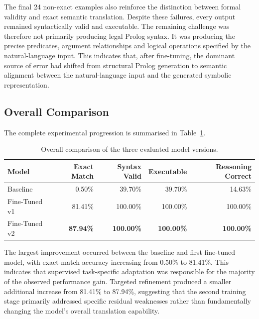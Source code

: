 \documentclass[11pt]{article} %
\theoremstyle{plain}
\theoremstyle{definition}
\begin{document}
The final 24 non-exact examples also reinforce the distinction between formal
validity and exact semantic translation. Despite these failures, every output
remained syntactically valid and executable. The remaining challenge was
therefore not primarily producing legal Prolog syntax. It was producing the
precise predicates, argument relationships and logical operations specified by
the natural-language input. This indicates that, after fine-tuning, the
dominant source of error had shifted from structural Prolog generation to
semantic alignment between the natural-language input and the generated
symbolic representation.

\subsection{Overall Comparison}

The complete experimental progression is summarised in
Table~\ref{tab:overall-comparison}.

\begin{table}[ht]
\centering
\caption{Overall comparison of the three evaluated model versions.}
\label{tab:overall-comparison}

\small
\setlength{\tabcolsep}{4pt}

\begin{tabular}{lrrrr}
\toprule
\textbf{Model} &
\textbf{Exact Match} &
\textbf{Syntax Valid} &
\textbf{Executable} &
\textbf{Reasoning Correct} \\
\midrule
Baseline      & 0.50\%  & 39.70\%  & 39.70\%  & 14.63\% \\
Fine-Tuned v1 & 81.41\% & 100.00\% & 100.00\% & 100.00\% \\
Fine-Tuned v2 & \textbf{87.94\%} &
                \textbf{100.00\%} &
                \textbf{100.00\%} &
                \textbf{100.00\%} \\
\bottomrule
\end{tabular}
\end{table}

The largest improvement occurred between the baseline and first fine-tuned model,
with exact-match accuracy increasing from 0.50\% to 81.41\%. This indicates that
supervised task-specific adaptation was responsible for the majority of the observed
performance gain. Targeted refinement produced a smaller additional increase from
81.41\% to 87.94\%, suggesting that the second training stage primarily addressed
specific residual weaknesses rather than fundamentally changing the model's
overall translation capability.
\end{document}
